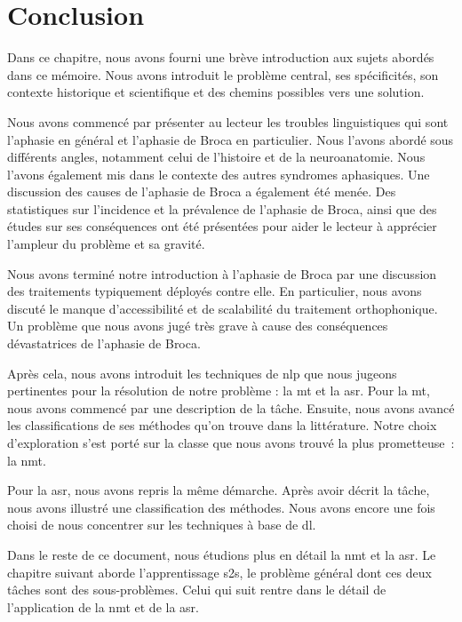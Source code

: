 \section{Conclusion}

Dans ce chapitre, nous avons fourni une brève introduction aux sujets abordés dans ce mémoire.
Nous avons introduit le problème central, ses spécificités, son contexte historique et scientifique 
et des chemins possibles vers une solution.

Nous avons commencé par présenter au lecteur les troubles linguistiques qui sont 
l'aphasie en général et l'aphasie de Broca en particulier.
Nous l'avons abordé sous différents angles, notamment celui de l'histoire et de la neuroanatomie.
Nous l'avons également mis dans le contexte des autres syndromes aphasiques.
Une discussion des causes de l'aphasie de Broca a également été menée.
Des statistiques sur l'incidence et la prévalence de l'aphasie de Broca,
ainsi que des études sur ses conséquences ont été présentées
pour aider le lecteur à apprécier l'ampleur du problème et sa gravité.

Nous avons terminé notre introduction à l'aphasie de Broca 
par une discussion des traitements typiquement déployés contre elle.
En particulier, nous avons discuté le manque d'accessibilité et de scalabilité du traitement orthophonique.
Un problème que nous avons jugé très grave à cause des conséquences dévastatrices de l'aphasie de Broca.

Après cela, nous avons introduit les techniques de \gls{nlp} que nous jugeons pertinentes
pour la résolution de notre problème : la \gls{mt} et la \gls{asr}.
Pour la \gls{mt}, nous avons commencé par une description de la tâche.
Ensuite, nous avons avancé les classifications de ses méthodes qu'on trouve dans la littérature.
Notre choix d'exploration s'est porté sur la classe que nous avons trouvé la plus prometteuse~:
la \gls{nmt}.

Pour la \gls{asr}, nous avons repris la même démarche.
Après avoir décrit la tâche, nous avons illustré une classification des méthodes.
Nous avons encore une fois choisi de nous concentrer sur les techniques à base de \gls{dl}.

Dans le reste de ce document, nous étudions plus en détail la \gls{nmt} et la \gls{asr}.
Le chapitre suivant aborde l'apprentissage \gls{s2s}, 
le problème général dont ces deux tâches sont des sous-problèmes.
Celui qui suit rentre dans le détail de l'application de la \gls{nmt} et de la \gls{asr}.
